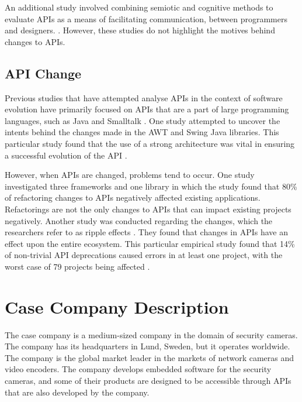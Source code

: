\documentclass[10pt,twocolumn]{article}
\begin{document}
An additional study involved combining semiotic and cognitive methods to evaluate APIs as a means of facilitating communication, between programmers and designers. \cite{afonso2012evaluating}. However, these studies do not highlight the motives behind changes to APIs.

\subsection{API Change}
Previous studies that have attempted analyse APIs in the context of software evolution have primarily focused on APIs that are a part of large programming languages, such as Java \cite{shi2011empirical} \cite{hou2011exploring} and Smalltalk \cite{robbes2012developers}. One study attempted to uncover the intents behind the changes made in the AWT and Swing Java libraries. This particular study found that the use of a strong architecture was vital in ensuring a successful evolution of the API \cite{hou2011exploring}.

However, when APIs are changed, problems tend to occur. One study \cite{dig2005role} investigated three frameworks and one library in which the study found that 80\% of refactoring changes to APIs negatively affected existing applications. Refactorings are not the only changes to APIs that can impact existing projects negatively. Another study was conducted regarding the changes, which the researchers refer to as ripple effects \cite{robbes2012developers}. They found that changes in APIs have an effect upon the entire ecosystem. This particular empirical study found that 14\% of non-trivial API deprecations caused errors in at least one project, with the worst case of 79 projects being affected \cite{robbes2012developers}.


\section{Case Company Description}
The case company is a medium-sized company in the domain of security cameras. The company has its headquarters in Lund, Sweden, but it operates worldwide. The company is the global market leader in the markets of network cameras and video encoders. The company develops embedded software for the security cameras, and some of their products are designed to be accessible through APIs that are also developed by the company. 

\end{document}
